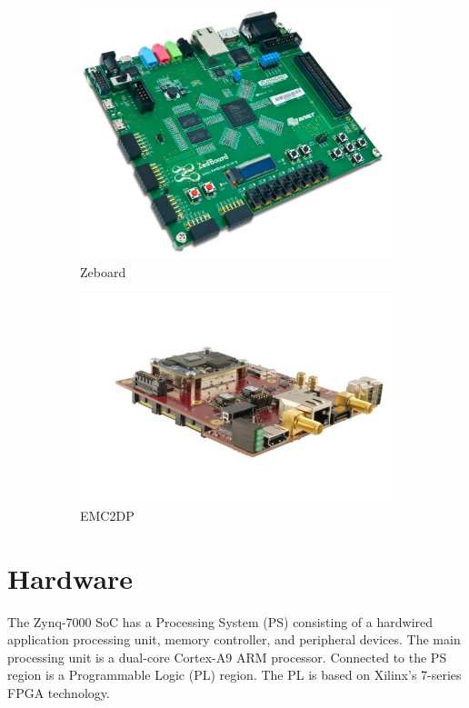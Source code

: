 \begin{figure}[H]
\centering
\begin{subfigure}[b]{0.3\textwidth}
\includegraphics[width=\textwidth]{./img/zedboard.jpg}
\caption{Zeboard}
\end{subfigure}
\begin{subfigure}[b]{0.3\textwidth}
\includegraphics[width=\textwidth]{./img/emc2dp.jpg}
\caption{EMC2DP}
\end{subfigure}
\caption{}
\label{fig:development_boards}
\end{figure}

\section{Hardware}
The Zynq-7000 SoC has a Processing System (PS) consisting of a hardwired application processing unit, memory controller, and peripheral devices. The main processing unit is a dual-core Cortex-A9 ARM processor. Connected to the PS region is a Programmable Logic (PL) region. The PL is based on Xilinx’s 7-series FPGA technology.\\

